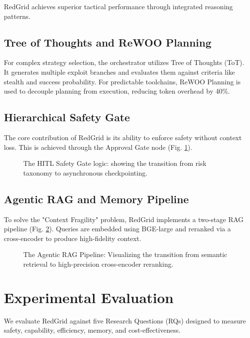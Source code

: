 \documentclass[conference]{IEEEtran}
\begin{document}
RedGrid achieves superior tactical performance through integrated reasoning patterns.

\subsection{Tree of Thoughts and ReWOO Planning}
For complex strategy selection, the orchestrator utilizes Tree of Thoughts (ToT). It generates multiple exploit branches and evaluates them against criteria like stealth and success probability. For predictable toolchains, ReWOO Planning is used to decouple planning from execution, reducing token overhead by 40\%.

\subsection{Hierarchical Safety Gate}
The core contribution of RedGrid is its ability to enforce safety without context loss. This is achieved through the Approval Gate node (Fig. \ref{fig:hitl_flow}).

\begin{figure}[h]
\centering

\caption{The HITL Safety Gate logic: showing the transition from risk taxonomy to asynchronous checkpointing.}
\label{fig:hitl_flow}
\end{figure}

\subsection{Agentic RAG and Memory Pipeline}
To solve the "Context Fragility" problem, RedGrid implements a two-stage RAG pipeline (Fig. \ref{fig:rag_pipeline}). Queries are embedded using BGE-large and reranked via a cross-encoder to produce high-fidelity context.

\begin{figure}[h]
\centering

\caption{The Agentic RAG Pipeline: Visualizing the transition from semantic retrieval to high-precision cross-encoder reranking.}
\label{fig:rag_pipeline}
\end{figure}

\section{Experimental Evaluation}
\label{sec:evaluation}

We evaluate RedGrid against five Research Questions (RQs) designed to measure safety, capability, efficiency, memory, and cost-effectiveness.
\end{document}

